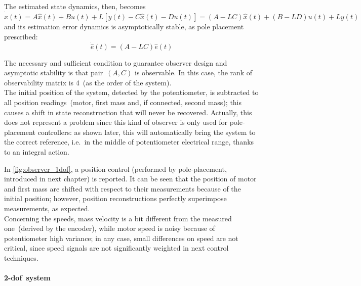 The estimated state dynamics, then, becomes
\begin{equation}
	\dot{\hat{x}}(t) = A\hat{x}(t) + Bu(t) + L [y(t) - C\hat{x}(t) - Du(t)] = (A-LC)\hat{x}(t) + (B-LD)u(t) + Ly(t)
	\label{eqn:est_state_dyn}
\end{equation}
and its estimation error dynamics is asymptotically stable, as pole placement prescribed:
\begin{equation}
	\dot{\hat{e}} (t) = (A-LC) \hat{e} (t)
\end{equation}

The necessary and sufficient condition to guarantee observer design and asymptotic stability is that pair~$(A,C)$ is observable. In this case, the rank of observability matrix is 4~(as the order of the system). \\

The initial position of the system, detected by the potentiometer, is subtracted to all position readings~(motor, first mass and, if connected, second mass); this causes a shift in state reconstruction that will never be recovered. Actually, this does not represent a problem since this kind of observer is only used for pole-placement controllers: as shown later, this will automatically bring the system to the correct reference, i.e.\ in the middle of potentiometer electrical range, thanks to an integral action.

In \cref{fig:observer_1dof}, a position control (performed by pole-placement, introduced in next chapter) is reported. It can be seen that the position of motor and first mass are shifted with respect to their measurements because of the initial position; however, position reconstructions perfectly superimpose measurements, as expected.\\
Concerning the speeds, mass velocity is a bit different from the measured one~(derived by the encoder), while motor speed is noisy because of potentiometer high variance; in any case, small differences on speed are not critical, since speed signals are not significantly weighted in next control techniques.

\paragraph{\acrshort{2-dof}\ system}

